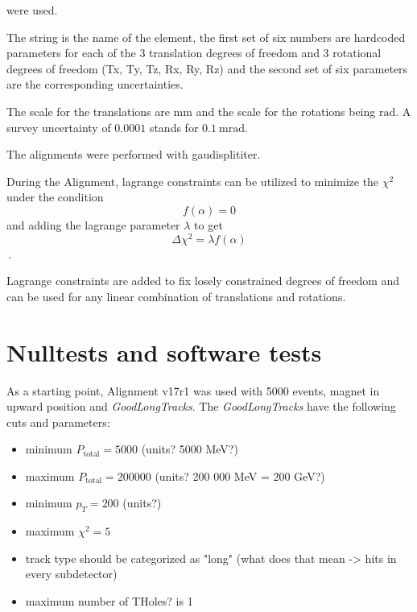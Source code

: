 were used.

The string is the name of the element, the first set of six numbers are hardcoded parameters for each of the 3 translation degrees of freedom and 3 rotational degrees of freedom (Tx, Ty, Tz, Rx, Ry, Rz) and the second set of six parameters are the corresponding uncertainties.

The scale for the translations are $\si{\milli\metre}$ and the scale for the rotations being $\si{\radian}$. A survey uncertainty of $\num{0.0001}$ stands for $\SI{0.1}{\milli\radian}$.

The alignments were performed with gaudisplititer.

During the Alignment, lagrange constraints can be utilized to minimize the
$\chi^2$ under the condition
\begin{equation}
  f(\alpha) = 0
\end{equation}
and adding the lagrange parameter $\lambda$ to get
\begin{equation}
  \Delta \chi^2 = \lambda f(\alpha)
\end{equation}\,.

Lagrange constraints are added to fix losely constrained degrees of freedom and can be used for any linear combination of translations and rotations.


\section{Nulltests and software tests}

As a starting point, Alignment v17r1 was used with 5000 events, magnet in upward position and \textit{GoodLongTracks}.
The \textit{GoodLongTracks} have the following cuts and parameters:
\begin{itemize}
  \item minimum $P_{\text{total}} = 5000$ (units? 5000 MeV?)
  \item maximum $P_{\text{total}} = 200 000$ (units? 200 000 MeV = 200 GeV?)
  \item minimum $p_T = 200$ (units?)
  \item maximum $\chi^2 = 5$
  \item track type should be categorized as "long" (what does that mean -> hits in every subdetector)
  \item maximum number of THoles? is 1
\end{itemize}


